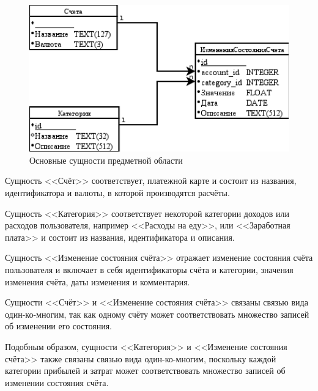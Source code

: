 \begin{figure}[h!]
  \centering
  \includegraphics[width=150mm]{pic/entities}
  \caption{Основные сущности предметной области}
  \label{fig:entities}
\end{figure}

Сущность <<Счёт>> соответствует, платежной карте
и состоит из названия, идентификатора и валюты, в которой производятся расчёты.

Сущность <<Категория>> соответствует некоторой категории доходов или расходов
пользователя, например <<Расходы на еду>>, или <<Заработная плата>>
и состоит из названия, идентификатора и описания.

Сущность <<Изменение состояния счёта>> отражает изменение состояния счёта
пользователя и включает в себя идентификаторы счёта и категории,
значения изменения счёта, даты изменения и комментария.

Сущности <<Счёт>> и <<Изменение состояния счёта>> связаны связью
вида один-ко-многим, так как одному счёту может соответствовать
множество записей об изменении его состояния.

Подобным образом, сущности <<Категория>> и <<Изменение состояния счёта>>
также связаны связью вида один-ко-многим, поскольку
каждой категории прибылей и затрат может соответствовать множество
записей об изменении состояния счёта.